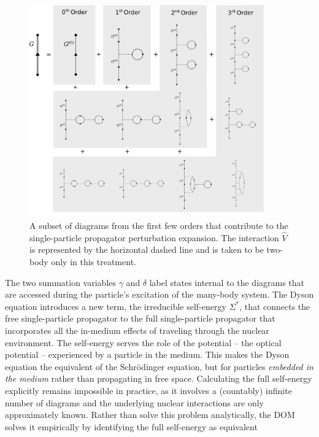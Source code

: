 \begin{figure}[tb]
    \centering
    \includegraphics[width=0.9\textwidth]{figures/SecondOrder.png}
    \caption[Example diagrams of the single-particle propagator perturbation expansion]
    {
        A subset of diagrams from the first few orders that contribute to the 
        single-particle propagator perturbation expansion.
        The interaction $\hat{V}$ is represented by the horizontal
        dashed line and is taken to be two-body only in this treatment.
    }
    \label{PerturbationExpansionDiagram}
\end{figure}
The two summation variables $\gamma$ and $\delta$ label states internal to the diagrams that are 
accessed during the particle's excitation of the many-body system\footnotemark. The Dyson
equation introduces a new term, the irreducible \gls{self-energy} $\Sigma^{*}$, that connects the free
single-particle propagator to the full single-particle propagator that incorporates all the
in-medium effects of traveling through the nuclear environment. The self-energy serves the role
of the potential -- the \gls{optical potential} -- experienced by a particle in the medium.
This makes the Dyson equation the
equivalent of the Schr\"odinger equation, but for particles \textit{embedded in the medium} 
rather than propagating in free space. Calculating the full self-energy explicitly remains
impossible in practice,
as it involves a (countably) infinite number of diagrams and the underlying nuclear
interactions are only approximately known. Rather than solve this problem
analytically, the DOM solves it empirically by identifying the full self-energy as equivalent
